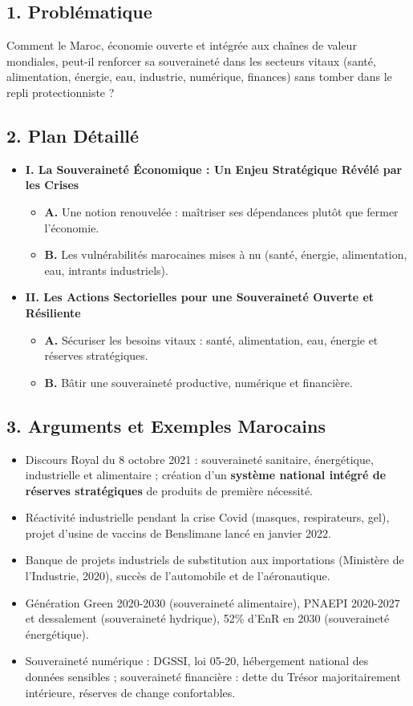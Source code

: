 \subsection*{1. Problématique}
Comment le Maroc, économie ouverte et intégrée aux chaînes de valeur mondiales, peut-il renforcer sa souveraineté dans les secteurs vitaux (santé, alimentation, énergie, eau, industrie, numérique, finances) sans tomber dans le repli protectionniste ?

\subsection*{2. Plan Détaillé}
\begin{itemize}
    \item \textbf{I. La Souveraineté Économique : Un Enjeu Stratégique Révélé par les Crises}
    \begin{itemize}
        \item \textbf{A.} Une notion renouvelée : maîtriser ses dépendances plutôt que fermer l'économie.
        \item \textbf{B.} Les vulnérabilités marocaines mises à nu (santé, énergie, alimentation, eau, intrants industriels).
    \end{itemize}
    \item \textbf{II. Les Actions Sectorielles pour une Souveraineté Ouverte et Résiliente}
    \begin{itemize}
        \item \textbf{A.} Sécuriser les besoins vitaux : santé, alimentation, eau, énergie et réserves stratégiques.
        \item \textbf{B.} Bâtir une souveraineté productive, numérique et financière.
    \end{itemize}
\end{itemize}

\subsection*{3. Arguments et Exemples Marocains}
\begin{itemize}
    \item Discours Royal du 8 octobre 2021 : souveraineté sanitaire, énergétique, industrielle et alimentaire ; création d'un \textbf{système national intégré de réserves stratégiques} de produits de première nécessité.
    \item Réactivité industrielle pendant la crise Covid (masques, respirateurs, gel), projet d'usine de vaccins de Benslimane lancé en janvier 2022.
    \item Banque de projets industriels de substitution aux importations (Ministère de l'Industrie, 2020), succès de l'automobile et de l'aéronautique.
    \item Génération Green 2020-2030 (souveraineté alimentaire), PNAEPI 2020-2027 et dessalement (souveraineté hydrique), 52\% d'EnR en 2030 (souveraineté énergétique).
    \item Souveraineté numérique : DGSSI, loi 05-20, hébergement national des données sensibles ; souveraineté financière : dette du Trésor majoritairement intérieure, réserves de change confortables.
\end{itemize}

